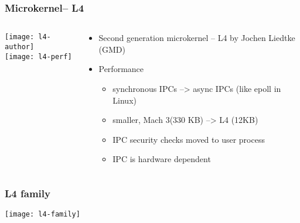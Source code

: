 \begin{frame}[plain]
	\frametitle{Microkernel-- L4}
	
	
	\begin{columns}
		
		\begin{column}{.4\textwidth}
			\centering
			\texttt{[image: l4-author]}
			\\
			\texttt{[image: l4-perf]}
		\end{column}
		
		\begin{column}{.6\textwidth}
			
			\begin{itemize}
				\item Second generation microkernel -- L4 by Jochen Liedtke (GMD)
				\item Performance
				\begin{itemize}
					\item synchronous IPCs  -->  async IPCs (like epoll in Linux)
					\item smaller, Mach 3(330 KB) --> L4 (12KB)
					\item IPC security checks moved to user process
					\item IPC is hardware dependent
				\end{itemize}		
			\end{itemize}	
			
		\end{column}
		
		
	\end{columns}
	
\end{frame}


\begin{frame}[plain]
	\frametitle{L4 family}
	
	\centering
	\texttt{[image: l4-family]}
	
\end{frame}


